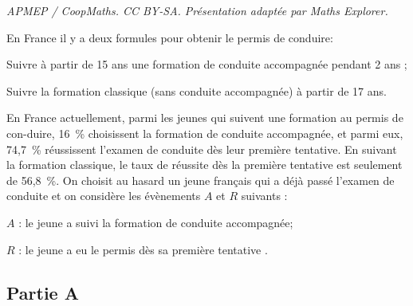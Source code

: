 \documentclass[10pt]{article}
\begin{document}
\noindent\textit{APMEP / CoopMaths. CC BY-SA. Présentation adaptée par Maths Explorer.}\par\medskip
\begin{list}{\textbullet}{En France il y a deux formules pour obtenir le permis de conduire:}
			\item Suivre à partir de 15 ans une formation de conduite accompagnée pendant 2 ans ;
		\item Suivre la formation classique (sans conduite accompagnée) à partir de 17 ans.
	\end{list}

	

	En France actuellement, parmi les jeunes qui suivent une formation au permis de con-duire, 16~\% choisissent la formation de conduite accompagnée, et parmi eux, 74,7~\% réussissent l'examen de conduite dès leur première tentative.
	En suivant la formation classique, le taux de réussite dès la première tentative est seulement de 56,8~\%.
	On choisit au hasard un jeune français qui a déjà passé l'examen de conduite et on considère les évènements $A$ et $R$ suivants :

	\begin{list}{\textbullet}{}
		\item $A$ : \og le jeune a suivi la formation de conduite accompagnée\fg{};
		\item $R$ : \og le jeune a eu le permis dès sa première tentative \fg{}.
	\end{list}







	\subsection*{Partie A}
\end{document}
